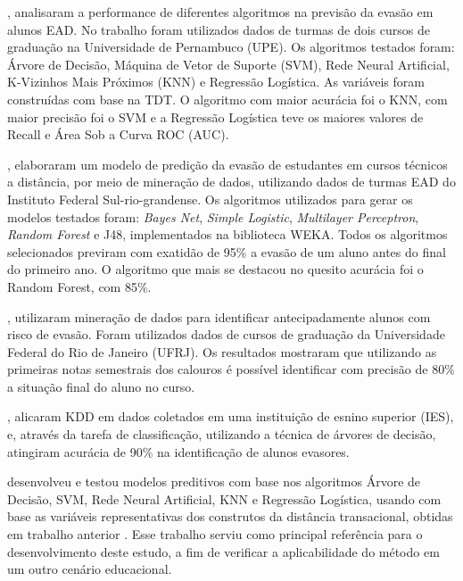 , analisaram a performance de diferentes algoritmos
na previsão da evasão em alunos EAD. No trabalho foram utilizados dados de
turmas de dois cursos de graduação na Universidade de Pernambuco (UPE). Os
algoritmos testados foram: Árvore de Decisão, Máquina de Vetor de Suporte (SVM),
Rede Neural Artificial, K-Vizinhos Mais Próximos (KNN) e Regressão Logística. As
variáveis foram construídas com base na TDT. O algoritmo com maior acurácia foi
o KNN, com maior precisão foi o SVM e a Regressão Logística teve os maiores
valores de Recall e Área Sob a Curva ROC (AUC).

, elaboraram um modelo de predição da evasão de
estudantes em cursos técnicos a distância, por meio de mineração de dados,
utilizando dados de turmas EAD do Instituto
Federal Sul-rio-grandense. Os algoritmos utilizados para gerar os
modelos testados foram: \textit{Bayes Net}, \textit{Simple Logistic},
\textit{Multilayer Perceptron}, \textit{Random Forest} e J48, implementados na
biblioteca WEKA. Todos os algoritmos selecionados previram com exatidão de 95\%
a evasão de um aluno antes do final do primeiro ano. O algoritmo que mais se
destacou no quesito acurácia foi o Random Forest, com 85\%.

, utilizaram mineração de dados para identificar
antecipadamente alunos com risco de evasão. Foram utilizados dados de cursos de
graduação da Universidade Federal do Rio de Janeiro (UFRJ). Os resultados
mostraram que utilizando as primeiras notas semestrais dos calouros é possível
identificar com precisão de 80\% a situação final do aluno no curso.

, alicaram KDD em dados coletados em uma
instituição de esnino superior (IES), e, através da tarefa de classificação,
utilizando a técnica de árvores de decisão, atingiram acurácia de 90\% na
identificação de alunos evasores.

 desenvolveu e testou modelos preditivos com base
nos algoritmos Árvore de Decisão, SVM, Rede Neural Artificial, KNN e Regressão
Logística, usando com base as variáveis representativas dos construtos da
distância transacional, obtidas em trabalho anterior \cite{ramos2016mapeamento}.
Esse trabalho serviu como principal referência para o desenvolvimento deste
estudo, a fim de verificar a aplicabilidade do método em um outro cenário
educacional.